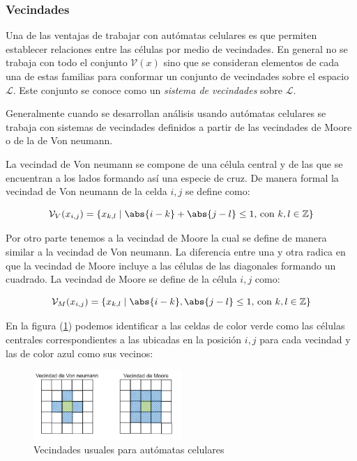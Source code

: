 \subsubsection{Vecindades}

Una de las ventajas de trabajar con autómatas celulares es que permiten establecer relaciones entre las células por medio de vecindades. En general no se trabaja con todo el conjunto $\mathcal{V}(x)$ sino que se consideran elementos de cada una de estas familias para conformar un conjunto de vecindades sobre el espacio $\mathcal{L}$. Este conjunto se conoce como un \textit{sistema de vecindades} sobre $\mathcal{L}$.

Generalmente cuando se desarrollan análisis usando autómatas celulares se trabaja con sistemas de vecindades definidos a partir de las vecindades de Moore o de la de Von neumann. 

La vecindad de Von neumann se compone de una célula central y de las que se encuentran a los lados formando así una especie de cruz. De manera formal la vecindad de Von neumann de la celda $i,j$ se define como:

$$\mathcal{V}_V(x_{i,j}) = \{x_{k,l}\mid\abs{i-k}+\abs{j-l}\leq1\text{, con }k,l\in\mathbb{Z}\}$$

Por otro parte tenemos a la vecindad de Moore la cual se define de manera similar a la vecindad de Von neumann. La diferencia entre una y otra radica en que la vecindad de Moore incluye a las células de las diagonales formando un cuadrado. La vecindad de Moore se define  de la célula $i,j$ como:

$$\mathcal{V}_M(x_{i,j}) = \{x_{k,l}\mid\abs{i-k},\abs{j-l}\leq1\text{, con }k,l\in\mathbb{Z}\}$$

En la figura (\ref{fig:Moore - Von neumann}) podemos identificar a las celdas de color verde como las células centrales correspondientes a las ubicadas en la posición $i,j$ para cada vecindad y las de color azul como sus vecinos:

\begin{figure}[h]
  \centering
    \includegraphics[width=0.5\textwidth]{Imagenes/vecindades.PNG}
  \caption{Vecindades usuales para autómatas celulares}
  \label{fig:Moore - Von neumann}
\end{figure}

